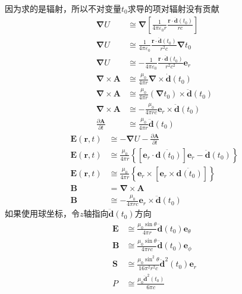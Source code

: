 因为求的是辐射，所以不对变量$t_0$求导的项对辐射没有贡献
\begin{align*}
    \boldsymbol{\nabla}U&\cong\boldsymbol{\nabla}\left[\frac{1}{4\pi\varepsilon_0r}\frac{\boldsymbol{r}\cdot\dot{\boldsymbol{d}}(t_0)}{r c}\right]\\
    \boldsymbol{\nabla}U&\cong\frac{1}{4\pi\varepsilon_0}\frac{\boldsymbol{r}\cdot\ddot{\boldsymbol{d}}(t_0)}{r^2 c}\boldsymbol{\nabla}t_0\\
    \boldsymbol{\nabla}U&\cong-\frac{1}{4\pi\varepsilon_0}\frac{\boldsymbol{r}\cdot\ddot{\boldsymbol{d}}(t_0)}{r^2 c^2}\boldsymbol{e}_r\\
    \boldsymbol{\nabla}\times\boldsymbol{A}&\cong\frac{\mu_0}{4\pi r}\boldsymbol{\nabla}\times\dot{\boldsymbol{d}}(t_0)\\
    \boldsymbol{\nabla}\times\boldsymbol{A}&\cong\frac{\mu_0}{4\pi r}\left(\boldsymbol{\nabla}t_0\right)\times\ddot{\boldsymbol{d}}(t_0)\\
    \boldsymbol{\nabla}\times\boldsymbol{A}&\cong-\frac{\mu_0}{4\pi rc}\boldsymbol{e}_r\times\ddot{\boldsymbol{d}}(t_0)\\
    \frac{\partial \boldsymbol{A}}{\partial t}&\cong\frac{\mu_0}{4\pi r}\ddot{\boldsymbol{d}}(t_0)
\end{align*}
\begin{align}
    \boldsymbol{E}(\boldsymbol{r},t)&\cong-\boldsymbol{\nabla}U-\frac{\partial \boldsymbol{A}}{\partial t}\nonumber\\
    \boldsymbol{E}(\boldsymbol{r},t)&\cong\frac{\mu_0}{4\pi r}\left\{\left[\boldsymbol{e}_r\cdot\ddot{\boldsymbol{d}(t_0)}\right]\boldsymbol{e}_r-\ddot{\boldsymbol{d}}(t_0)\right\}\nonumber\\
    \boldsymbol{E}(\boldsymbol{r},t)&\cong\frac{\mu_0}{4\pi r}\left\{\boldsymbol{e}_r\times\left[\boldsymbol{e}_r\times\ddot{\boldsymbol{d}(t_0)}\right]\right\}\\
    \boldsymbol{B}&=\boldsymbol{\nabla}\times\boldsymbol{A}\nonumber\\
    \boldsymbol{B}&\cong-\frac{\mu_0}{4\pi rc}\boldsymbol{e}_r\times\ddot{\boldsymbol{d}}(t_0)
\end{align}
如果使用球坐标，令$z$轴指向$\ddot{\boldsymbol{d}}(t_0)$方向
\begin{align}
    \boldsymbol{E}&\cong\frac{\mu_0\sin\theta}{4\pi r}\ddot{\boldsymbol{d}}(t_0)\boldsymbol{e}_\theta\\
    \boldsymbol{B}&\cong\frac{\mu_0\sin\theta}{4\pi rc}\ddot{\boldsymbol{d}}(t_0)\boldsymbol{e}_\phi\\
    \boldsymbol{S}&\cong\frac{\mu_0\sin^2\theta}{16\pi^2 r^2c}\ddot{\boldsymbol{d}}^2(t_0)\boldsymbol{e}_r\\
    P&\cong\frac{\mu_0\ddot{\boldsymbol{d}}^2(t_0)}{6\pi c}
\end{align}
